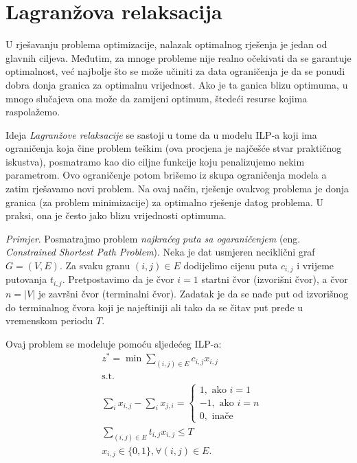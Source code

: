 \documentclass[a4paper, utf8, 11pt, colorlinks]{book}
\begin{document}
\section{Lagranžova relaksacija}
U rješavanju problema optimizacije, nalazak optimalnog rješenja je jedan od glavnih ciljeva. Međutim, za mnoge probleme nije realno očekivati da se garantuje optimalnost, već najbolje što se može učiniti za data ograničenja  je da se ponudi dobra donja granica za optimalnu vrijednost. Ako je ta ganica blizu optimuma, u mnogo slučajeva ona može da zamijeni optimum, štedeći resurse kojima raspolažemo. 

Ideja \emph{Lagranžove relaksacije} se sastoji u tome da u modelu ILP-a  koji ima  ograničenja koja čine problem teškim (ova procjena je najčešće stvar praktičnog iskustva),  posmatramo kao dio ciljne funkcije koju penalizujemo nekim parametrom.  %
Ovo ograničenje potom brišemo iz skupa ograničenja modela a zatim rješavamo novi problem. Na ovaj način, rješenje ovakvog problema je donja granica (za problem minimizacije) za optimalno rješenje datog problema. U praksi, ona je često jako blizu vrijednosti optimuma. 

\emph{Primjer}. Posmatrajmo problem \emph{najkraćeg puta sa ogaraničenjem} (eng. \emph{Constrained Shortest Path Problem}). Neka je dat usmjeren neciklični graf $G=(V,E)$. Za svaku granu $(i,j) \in E$ dodijelimo cijenu puta $c_{i,j}$ i vrijeme putovanja $t_{i,j}$. Pretpostavimo da je čvor $i=1$ startni čvor (izvorišni čvor), a čvor $n = |V|$ je završni čvor (terminalni čvor). Zadatak je da se nađe put  od izvorišnog do terminalnog čvora koji je najeftiniji ali tako da se čitav put pređe u vremenskom periodu $T$.

Ovaj problem se modeluje pomoću sljedećeg ILP-a:
 \begin{align}
    &z^*=\min\sum_{(i,j) \in E }c_{i,j}x_{i,j} \\
    &\mbox{s.t. }\\
    & \sum_{i} x_{i,j} - \sum_{i} x_{j,i} = \begin{cases}  
                                               1, \mbox{ ako } i=1 \\
                                              -1, \mbox{ ako } i=n \\
                                               0, \mbox{ inače }
                                            \end{cases} \\
    & \sum_{(i,j) \in E} t_{i,j} x_{i,j} \leq T \\
    & x_{i,j} \in \{0, 1 \}, \forall (i,j) \in E.
\end{align} 
\end{document}
